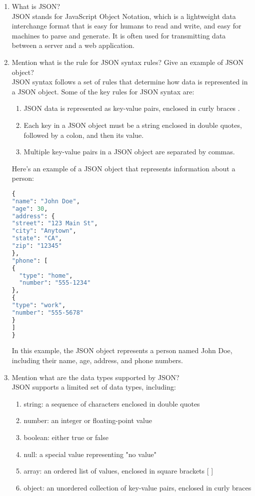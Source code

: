 \documentclass[11pt]{article}
\begin{document}
\begin{enumerate}
    \item What is JSON?\\

          JSON stands for JavaScript Object Notation, which is a lightweight data interchange format that is easy for humans to read and write, and easy for machines to parse and generate. It is often used for transmitting data between a server and a web application.
    \item Mention what is the rule for JSON syntax rules? Give an example of JSON object?\\

          JSON syntax follows a set of rules that determine how data is represented in a JSON object. Some of the key rules for JSON syntax are:
          \begin{enumerate}
              \item JSON data is represented as key-value pairs, enclosed in curly braces { }.
              \item Each key in a JSON object must be a string enclosed in double quotes, followed by a colon, and then its value.
              \item Multiple key-value pairs in a JSON object are separated by commas.
          \end{enumerate}
          Here's an example of a JSON object that represents information about a person:
          \begin{lstlisting}[language=python]
{
"name": "John Doe",
"age": 30,
"address": {
"street": "123 Main St",
"city": "Anytown",
"state": "CA",
"zip": "12345"
},
"phone": [
{
  "type": "home",
  "number": "555-1234"
},
{
"type": "work",
"number": "555-5678"
}
]
}
\end{lstlisting}
          In this example, the JSON object represents a person named John Doe, including their name, age, address, and phone numbers.
    \item Mention what are the data types supported by JSON?\\
          JSON supports a limited set of data types, including:
          \begin{enumerate}
              \item string: a sequence of characters enclosed in double quotes
              \item number: an integer or floating-point value
              \item boolean: either true or false
              \item null: a special value representing "no value"
              \item array: an ordered list of values, enclosed in square brackets [ ]
              \item object: an unordered collection of key-value pairs, enclosed in curly braces { }
          \end{enumerate}


\end{enumerate}
\end{document}
